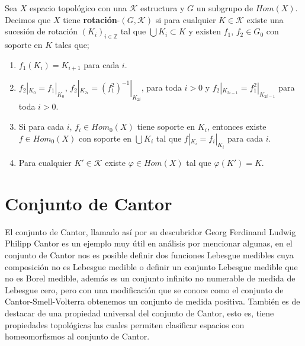 \begin{df}
Sea $X$ espacio topológico con una $\mathcal{K}$ estructura y $G$ un subgrupo de $Hom(X)$. Decimos que $X$ tiene \textbf{rotación}-$(G,\mathcal{K})$ si para cualquier $K \in \mathcal{K}$ existe una sucesión de rotación $(K_i)_{i \in \mathbb{Z}}$ tal que $\bigcup K_i \subset K$ y existen $f_1$, $f_2 \in G_0$ con soporte en $K$ tales que; 

\begin{enumerate}
\item $f_1(K_i)=K_{i+1}$ para cada $i$.
\item $f_2|_{K_0}=f_1|_{K_0}$, $f_2|_{K_{2i}}=(f_1^2)^{-1}|_{K_{2i}}$, para toda $i >0$ y $f_2|_{K_{2i-1}}=f_1^2|_{K_{2i-1}}$ para toda $i >0$.
\item Si para cada $i$, $f_i \in Hom_0(X)$ tiene soporte en $K_i$, entonces existe $f \in Hom_0(X)$ con soporte en $\bigcup K_i$ tal que $f|_{K_i}=f_i|_{K_i}$  para cada $i$.
		
\item Para cualquier $K' \in \mathcal{K}$ existe $\varphi \in Hom(X)$ tal que $\varphi(K')=K.$

\end{enumerate}
\end{df}

%
%	
%	
%
%
%
%
%





\section{Conjunto de Cantor}

El conjunto de Cantor, llamado así por su descubridor Georg Ferdinand Ludwig Philipp Cantor es un ejemplo muy útil en análisis por mencionar algunas, en el conjunto de Cantor nos es posible definir dos funciones Lebesgue medibles cuya composición no es Lebesgue medible o definir un conjunto Lebesgue medible que no es Borel medible, además es un conjunto infinito no numerable de medida de Lebesgue cero, pero con una modificación que se conoce como el conjunto de Cantor-Smell-Volterra obtenemos un conjunto de medida positiva. También es de destacar de una propiedad universal del conjunto de Cantor, esto es, tiene propiedades topológicas las cuales permiten clasificar espacios con homeomorfismos al conjunto de Cantor. 

